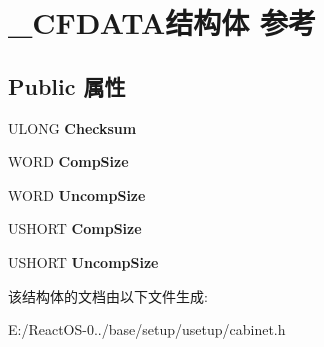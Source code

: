 \hypertarget{struct___c_f_d_a_t_a}{}\section{\+\_\+\+C\+F\+D\+A\+T\+A结构体 参考}
\label{struct___c_f_d_a_t_a}
\subsection*{Public 属性}
\begin{DoxyCompactItemize}
\item 
\mbox{\label{struct___c_f_d_a_t_a_a5cc3c13d2a64bf3c0f940dd073f2e191}} 
U\+L\+O\+NG {\bfseries Checksum}
\item 
\mbox{\label{struct___c_f_d_a_t_a_a45bc76ea95a301bed71d63fec7891d18}} 
W\+O\+RD {\bfseries Comp\+Size}
\item 
\mbox{\label{struct___c_f_d_a_t_a_ab8d081c112cd97b958e7be5d03aacb20}} 
W\+O\+RD {\bfseries Uncomp\+Size}
\item 
\mbox{\label{struct___c_f_d_a_t_a_a125c9a25ad6ad97cace62679a6a58c09}} 
U\+S\+H\+O\+RT {\bfseries Comp\+Size}
\item 
\mbox{\label{struct___c_f_d_a_t_a_a291c4460b3d8640048e6bee712b9fbf6}} 
U\+S\+H\+O\+RT {\bfseries Uncomp\+Size}
\end{DoxyCompactItemize}


该结构体的文档由以下文件生成\+:\begin{DoxyCompactItemize}
\item 
E\+:/\+React\+O\+S-\/0../base/setup/usetup/cabinet.\+h\end{DoxyCompactItemize}
